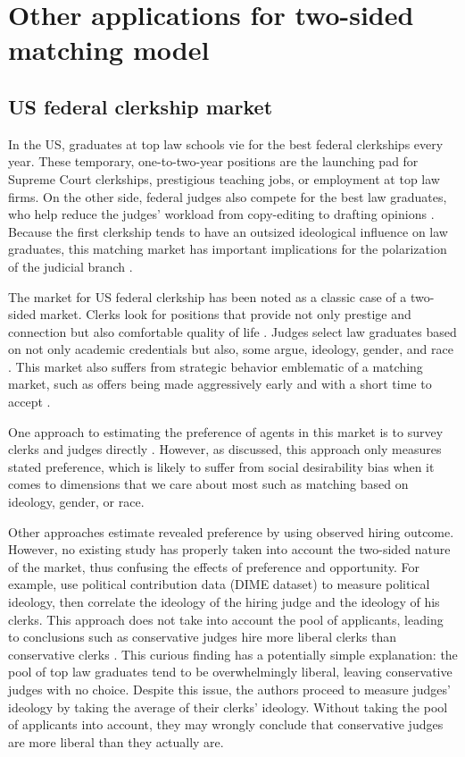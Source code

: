 \section{Other applications for two-sided matching model}

\subsection{US federal clerkship market}

In the US, graduates at top law schools vie for the best federal clerkships
every year. These temporary, one-to-two-year positions are the launching pad for
Supreme Court clerkships, prestigious teaching jobs, or employment at top law
firms. On the other side, federal judges also compete for the best law
graduates, who help reduce the judges' workload from copy-editing to drafting
opinions \citep{Gulati2016, Posner2001}. Because the first clerkship tends to
have an outsized ideological influence on law graduates, this matching market
has important implications for the polarization of the judicial branch
\citep{Ditslear2001, Liptak2007}.

The market for US federal clerkship has been noted as a classic case of a
two-sided market. Clerks look for positions that provide not only prestige and
connection but also comfortable quality of life \citep{Posner2001}. Judges
select law graduates based on not only academic credentials but also, some
argue, ideology, gender, and race \citep{Slotnick1984}. This market also suffers
from strategic behavior emblematic of a matching market, such as offers being
made aggressively early and with a short time to accept \citep{Posner2001,
  Posner2007}.

One approach to estimating the preference of agents in this market is to survey
clerks and judges directly \citep{Peppers2008}. However, as discussed, this
approach only measures stated preference, which is likely to suffer from social
desirability bias when it comes to dimensions that we care about most such as
matching based on ideology, gender, or race.

Other approaches estimate revealed preference by using observed hiring outcome.
However, no existing study has properly taken into account the two-sided nature
of the market, thus confusing the effects of preference and opportunity. For
example, \citet{Bonica2017} use political contribution data (DIME dataset) to
measure political ideology, then correlate the ideology of the hiring judge and
the ideology of his clerks. This approach does not take into account the pool of
applicants, leading to conclusions such as conservative judges hire more liberal
clerks than conservative clerks \citep[31]{Bonica2017}. This curious finding has
a potentially simple explanation: the pool of top law graduates tend to be
overwhelmingly liberal, leaving conservative judges with no choice. Despite
this issue, the authors proceed to measure judges' ideology by taking the
average of their clerks' ideology. Without taking the pool of applicants into
account, they may wrongly conclude that conservative judges are more liberal
than they actually are.


